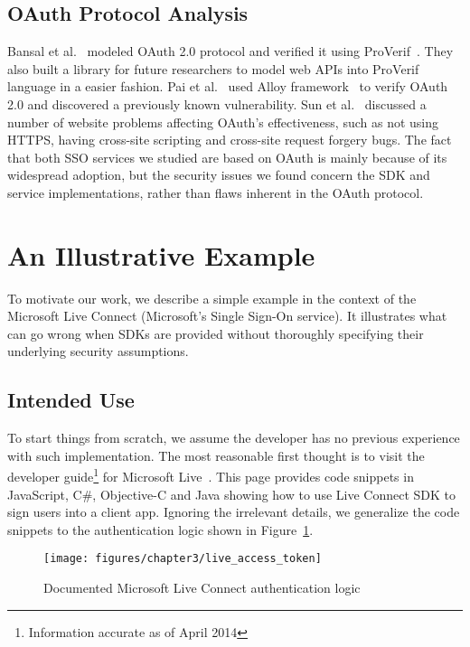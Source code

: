 \subsection{OAuth Protocol Analysis}
Bansal et al.~\cite{6266164} modeled OAuth 2.0 protocol and verified it using ProVerif~\cite{Blanchet:2001:ECP:872752.873511}.  They also built a library for future researchers to model web APIs into ProVerif language in a easier fashion.  Pai et al.~\cite{5966531} used Alloy framework~\cite{Alloy} to verify OAuth 2.0 and discovered a previously known vulnerability.  Sun et al.~\cite{Sun:2012:DDE:2382196.2382238} discussed a number of website problems affecting OAuth's effectiveness, such as not using HTTPS, having cross-site scripting and cross-site request forgery bugs.  The fact that both SSO services we studied are based on OAuth is mainly because of its widespread adoption, but the security issues we found concern the SDK and service implementations, rather than flaws inherent in the OAuth protocol.  

\section{An Illustrative Example}
\label{sec:explicating_illustrative_example}

To motivate our work, we describe a simple example in the context of the Microsoft Live Connect (Microsoft's Single Sign-On service). It illustrates what can go wrong when SDKs are provided without thoroughly specifying their underlying security assumptions.   

\subsection{Intended Use}

To start things from scratch, we assume the developer has no previous experience with such implementation.  The most reasonable first thought is to visit the developer guide\footnote{Information accurate as of April 2014} for Microsoft Live~\cite{LiveConnectDoc}.  This page provides code snippets in JavaScript, C\#, Objective-C and Java showing how to use Live Connect SDK to sign users into a client app.  Ignoring the irrelevant details, we generalize the code snippets to the authentication logic shown in Figure~\ref{fig:live_access_token}.

\begin{figure}[hbt]
\centering
\texttt{[image: figures/chapter3/live\_access\_token]}
\caption{Documented Microsoft Live Connect authentication logic}
\label{fig:live_access_token}
\end{figure}

